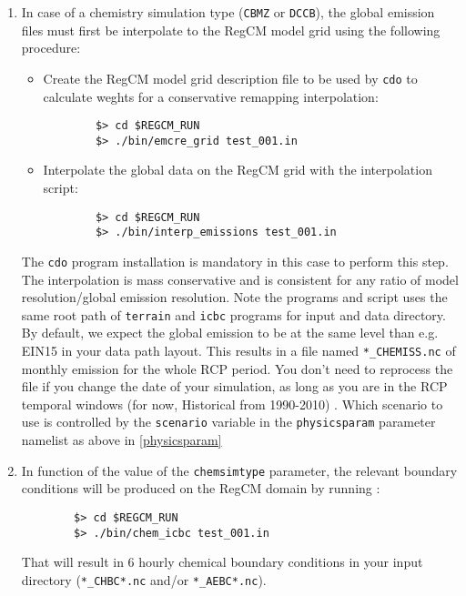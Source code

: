 \begin{enumerate}
  \item In case of a chemistry simulation type (\verb=CBMZ= or \verb=DCCB=), the
    global emission files must first be interpolate to the RegCM model grid
    using the following procedure:
    \begin{itemize}
      \item Create the RegCM model grid description file to be used by
        \verb=cdo= to calculate weghts for a conservative remapping
        interpolation:
        \begin{Verbatim}
        $> cd $REGCM_RUN
        $> ./bin/emcre_grid test_001.in
        \end{Verbatim}
      \item Interpolate the global data on the RegCM grid with the interpolation
        script:
        \begin{Verbatim}
        $> cd $REGCM_RUN
        $> ./bin/interp_emissions test_001.in
        \end{Verbatim}
    \end{itemize}
    The \verb=cdo= program installation is mandatory in this case to perform
    this step. The interpolation is mass conservative and is consistent for
    any ratio of model resolution/global emission resolution.
    Note the programs and script uses the same root path of \verb=terrain= and
    \verb=icbc= programs for input and data directory. By default, we expect
    the global emission to be at the same level than e.g. EIN15 in your data
    path layout.
    This results in a file named \verb=*_CHEMISS.nc= of monthly emission for
    the whole RCP period. You don’t need to reprocess the file if you change
    the date of your simulation, as long as you are in the RCP temporal windows
    (for now, Historical from 1990-2010) .
    Which scenario to use is controlled by the \verb=scenario= variable in the
    \verb=physicsparam= parameter namelist as above in \ref{physicsparam}
  \item In function of the value of the \verb=chemsimtype= parameter, the
    relevant boundary conditions will be produced on the RegCM domain by
    running :
        \begin{Verbatim}
        $> cd $REGCM_RUN
        $> ./bin/chem_icbc test_001.in
        \end{Verbatim}
    That will result in 6 hourly chemical boundary conditions in your input
    directory (\verb=*_CHBC*.nc= and/or \verb=*_AEBC*.nc=).
\end{enumerate}

